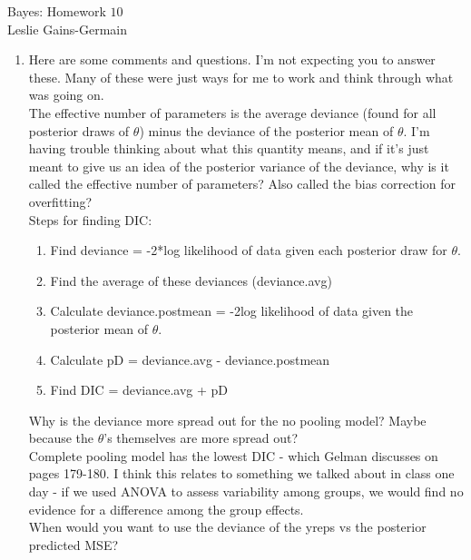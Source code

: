 \documentclass[12pt]{article}\usepackage[]{graphicx}\usepackage[]{color}
\begin{document}
  
  
\begin{center}
\large{Bayes: Homework $10$} \\
Leslie Gains-Germain
\end{center}

\begin{doublespacing}

\begin{enumerate}

\item Here are some comments and questions. I'm not expecting you to answer these. Many of these were just ways for me to work and think through what was going on. \\

The effective number of parameters is the average deviance (found for all posterior draws of $\theta$) minus the deviance of the posterior mean of $\theta$. I'm having trouble thinking about what this quantity means, and if it's just meant to give us an idea of the posterior variance of the deviance, why is it called the effective number of parameters? Also called the bias correction for overfitting? \\

Steps for finding DIC:
\begin{enumerate}
\item Find deviance = -2*log likelihood of data given each posterior draw for $\theta$. 
\item Find the average of these deviances (deviance.avg)
\item Calculate deviance.postmean = -2log likelihood of data given the posterior mean of $\theta$.
\item Calculate pD = deviance.avg - deviance.postmean
\item Find DIC  = deviance.avg + pD
\end{enumerate}

Why is the deviance more spread out for the no pooling model? Maybe because the $\theta$'s themselves are more spread out? \\

Complete pooling model has the lowest DIC - which Gelman discusses on pages 179-180. I think this relates to something we talked about in class one day - if we used ANOVA to assess variability among groups, we would find no evidence for a difference among the group effects. \\

When would you want to use the deviance of the yreps vs the posterior predicted MSE? \\


\end{enumerate}
\end{doublespacing}
\end{document}
